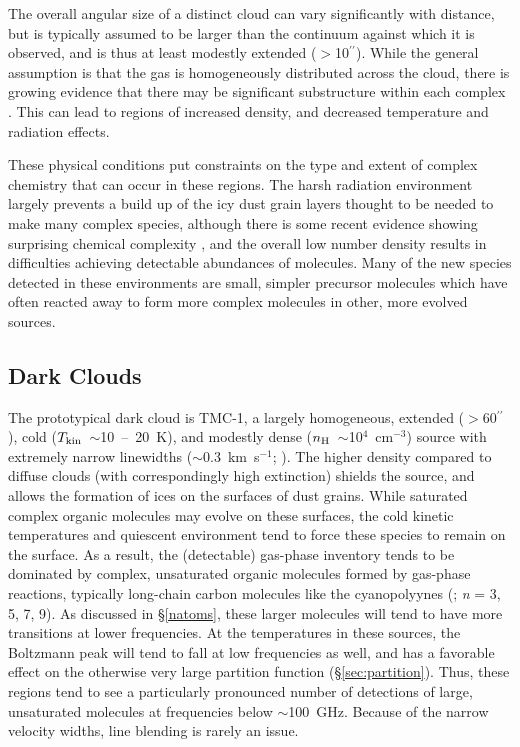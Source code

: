 \documentclass[twocolumn]{aastex631}
\begin{document}
The overall angular size of a distinct cloud can vary significantly with distance, but is typically assumed to be larger than the continuum against which it is observed, and is thus at least modestly extended ($>$10$^{\prime\prime}$).  While the general assumption is that the gas is homogeneously distributed across the cloud, there is growing evidence that there may be significant substructure within each complex \citep{Corby:2018nd}.  This can lead to regions of increased density, and decreased temperature and radiation effects.

These physical conditions put constraints on the type and extent of complex chemistry that can occur in these regions.  The harsh radiation environment largely prevents a build up of the icy dust grain layers thought to be needed to make many complex species, although there is some recent evidence showing surprising chemical complexity \citep{Thiel:2017fh}, and the overall low number density results in difficulties achieving detectable abundances of molecules.  Many of the new species detected in these environments are small, simpler precursor molecules which have often reacted away to form more complex molecules in other, more evolved sources.

\subsection{Dark Clouds}

The prototypical dark cloud is TMC-1, a largely homogeneous, extended ($>$60$^{\prime\prime}$), cold ($T_{\rm{kin}}$~$\sim$10~--~20~K), and modestly dense ($n_{\rm{H}}$~$\sim$10$^4$~cm$^{-3}$) source \citep{Bell:1998mw,Hincelin:2011fr,Liszt:2012ft} with extremely narrow linewidths ($\sim$0.3~km~s$^{-1}$; \citealt{McGuire:2017ud}).  The higher density compared to diffuse clouds (with correspondingly high extinction) shields the source, and allows the formation of ices on the surfaces of dust grains.  While saturated complex organic molecules may evolve on these surfaces, the cold kinetic temperatures and quiescent environment tend to force these species to remain on the surface.  As a result, the (detectable) gas-phase inventory tends to be dominated by complex, unsaturated organic molecules formed by gas-phase reactions, typically long-chain carbon molecules like the cyanopolyynes (; \emph{n} = 3, 5, 7, 9).  As discussed in \S\ref{natoms}, these larger molecules will tend to have more transitions at lower frequencies.  At the temperatures in these sources, the Boltzmann peak will tend to fall at low frequencies as well, and has a favorable effect on the otherwise very large partition function (\S\ref{sec:partition}). Thus, these regions tend to see a particularly pronounced number of detections of large, unsaturated molecules at frequencies below $\sim$100~GHz.  Because of the narrow velocity widths, line blending is rarely an issue.
\end{document}
